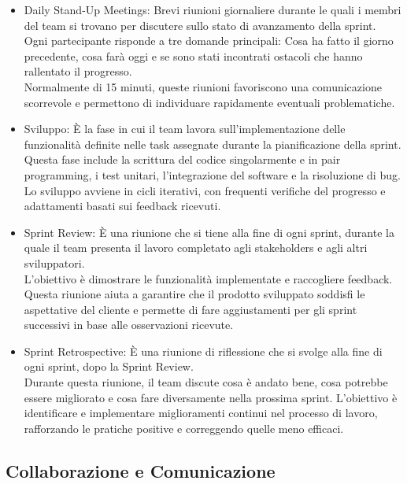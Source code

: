 \begin{itemize}
  \item Daily Stand-Up Meetings: Brevi riunioni giornaliere durante le quali i
    membri del team si trovano per discutere sullo stato di avanzamento della
    sprint.\\ Ogni partecipante risponde a tre domande principali: Cosa ha fatto
    il giorno precedente, cosa farà oggi e se sono stati incontrati ostacoli che
    hanno rallentato il progresso.\\ Normalmente di 15 minuti, queste riunioni favoriscono
    una comunicazione scorrevole e permettono di individuare rapidamente eventuali
    problematiche.

  \item Sviluppo: È la fase in cui il team lavora sull'implementazione delle
    funzionalità definite nelle task assegnate durante la pianificazione della
    sprint.\\ Questa fase include la scrittura del codice singolarmente e in
    pair programming, i test unitari, l'integrazione del software e la
    risoluzione di bug.\\ Lo sviluppo avviene in cicli iterativi, con frequenti verifiche
    del progresso e adattamenti basati sui feedback ricevuti.

  \item Sprint Review: È una riunione che si tiene alla fine di ogni sprint, durante
    la quale il team presenta il lavoro completato agli stakeholders e agli altri
    sviluppatori.\\ L'obiettivo è dimostrare le funzionalità implementate e raccogliere
    feedback.\\ Questa riunione aiuta a garantire che il prodotto sviluppato soddisfi
    le aspettative del cliente e permette di fare aggiustamenti per gli sprint successivi
    in base alle osservazioni ricevute.

  \item Sprint Retrospective: È una riunione di riflessione che si svolge alla
    fine di ogni sprint, dopo la Sprint Review.\\ Durante questa riunione, il
    team discute cosa è andato bene, cosa potrebbe essere migliorato e cosa fare
    diversamente nella prossima sprint. L'obiettivo è identificare e
    implementare miglioramenti continui nel processo di lavoro, rafforzando le pratiche
    positive e correggendo quelle meno efficaci.
\end{itemize}

\subsection{Collaborazione e Comunicazione}
\label{sub:comunicazione}

